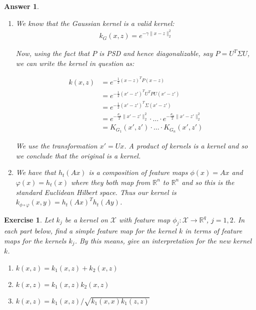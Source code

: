 \documentclass[12pt]{article}
\theoremstyle{colon}
\newtheorem{exercise}{Exercise}
\newtheorem*{answer}{Answer}
\begin{document}
\begin{answer}
\begin{enumerate}[label=\alph*)]
      Which is in $\mathbb{R}^{3n}$ and hence a Hilbert space. This feature map coupled with the standard inner product yields our kernel.

    \item We know that the Gaussian kernel is a valid kernel:
      \begin{gather*}
        k_G(x,z) = e^{-\gamma \lVert x - z \rVert_2^2}
      \end{gather*}

      Now, using the fact that $P$ is PSD and hence diagonalizable, say $P = U^T \Sigma U$, we can write the kernel in question as:

      \begin{align*}
        k(x,z) &= e^{-\frac{1}{2} (x-z)^T P (x-z)} \\
        &= e^{-\frac{1}{2} (x'-z')^T U^T P U (x'-z')} \\
        &= e^{-\frac{1}{2} (x'-z')^T \Sigma (x'-z')} \\
        &= e^{-\frac{\sigma_1}{2} \lVert x' - z' \rVert_2^2} \cdot \hdots \cdot e^{-\frac{\sigma_n}{2} \lVert x' - z' \rVert_2^2} \\
        &= K_{G_1} (x', z') \cdot \hdots \cdot K_{G_n} (x', z')
      \end{align*}

      We use the transformation $x' = U x$. A product of kernels is a kernel and so we conclude that the original is a kernel.

    \item We have that $h_t(A x)$ is a composition of feature maps $\phi(x) = A x$ and $\varphi(x) = h_t(x)$ where they both map from $\mathbb{R}^n$ to $\mathbb{R}^n$ and so this is the standard Euclidean Hilbert space. Thus our kernel is $k_{\phi \circ \varphi}(x,y) = h_t(Ax)^T h_t(Ay)$.
  \end{enumerate}

\end{answer}

\clearpage

\begin{exercise}
  Let $k_j$ be a kernel on $\mathcal{X}$ with feature map $\phi_j: \mathcal{X} \rightarrow \mathbb{R}^q$, $j = 1, 2$. In each part below, find a simple feature map for the kernel $k$ in terms of feature maps for the kernels $k_j$. By this means, give an interpretation for the new kernel $k$.

  \begin{enumerate}[label=\alph*)]
    \item $k(x,z) = k_1(x,z) + k_2(x,z)$

    \item $k(x,z) = k_1(x,z) k_2(x,z)$

    \item $k(x,z) = k_1(x,z)/ \sqrt{k_1(x,x) k_1(z,z)}$
  \end{enumerate}
\end{exercise}
\end{document}
